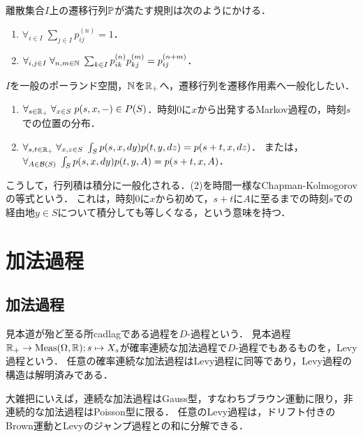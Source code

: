 \documentclass[uplatex,dvipdfmx]{jsreport}
\begin{document}
\begin{discussion}
    離散集合$I$上の遷移行列$\mathbb{P}$が満たす規則は次のようにかける．
    \begin{enumerate}
        \item $\forall_{i\in I}\;\sum_{j\in I}p_{ij}^{(n)}=1$．
        \item $\forall_{i,j\in I}\;\forall_{n,m\in\mathbb{N}}\;\sum_{k\in I}p_{ik}^{(n)}p_{kj}^{(m)}=p_{ij}^{(n+m)}$．
    \end{enumerate}
    $I$を一般のポーランド空間，$\mathbb{N}$を$\mathbb{R}_+$へ，遷移行列を遷移作用素へ一般化したい．
    \begin{enumerate}
        \item $\forall_{s\in\mathbb{R}_+}\;\forall_{x\in S}\;p(s,x,-)\in P(S)$．時刻$0$に$x$から出発するMarkov過程の，時刻$s$での位置の分布．
        \item $\forall_{s,t\in\mathbb{R}_+}\;\forall_{x,z\in S}\;\int_Sp(s,x,dy)p(t,y,dz)=p(s+t,x,dz)$．
        または，$\forall_{A\in\mathcal{B}(S)}\;\int_Sp(s,x,dy)p(t,y,A)=p(s+t,x,A)$．
    \end{enumerate}
    こうして，行列積は積分に一般化される．(2)を時間一様なChapman-Kolmogorovの等式という．
    これは，時刻$0$に$x$から初めて，$s+t$に$A$に至るまでの時刻$s$での経由地$y\in S$について積分しても等しくなる，という意味を持つ．
\end{discussion}

\chapter{加法過程}

\section{加法過程}

\begin{tcolorbox}[colframe=ForestGreen, colback=ForestGreen!10!white,breakable,colbacktitle=ForestGreen!40!white,coltitle=black,fonttitle=\bfseries\sffamily,
title=]
    見本道が殆ど至る所cadlagである過程を$D$-過程という．
    見本過程$\mathbb{R}_+\to\mathrm{Meas}(\Omega,\mathbb{R});s\mapsto X_s$が確率連続な加法過程で$D$-過程でもあるものを，Levy過程という．
    任意の確率連続な加法過程はLevy過程に同等であり，Levy過程の構造は解明済みである．

    大雑把にいえば，連続な加法過程はGauss型，すなわちブラウン運動に限り，非連続的な加法過程はPoisson型に限る．
    任意のLevy過程は，ドリフト付きのBrown運動とLevyのジャンプ過程との和に分解できる．
\end{tcolorbox}
\end{document}
